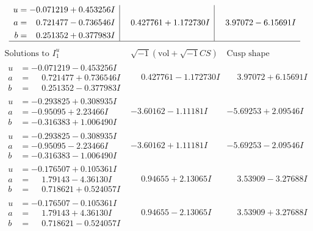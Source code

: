 \documentclass[1p]{elsarticle_modified}
\theoremstyle{definition}
\newcommand{\I}{\sqrt{-1}}
\begin{document}
$$\begin{array}{c|c|c}
\begin{aligned}
u &= -0.071219 + 0.453256 I \\
a &= \phantom{-}0.721477 - 0.736546 I \\
b &= \phantom{-}0.251352 + 0.377983 I\end{aligned}
 & \phantom{-}0.427761 + 1.172730 I & \phantom{-}3.97072 - 6.15691 I\\
 \hline 
 \end{array}$$\newpage$$\begin{array}{c|c|c}  
\text{Solutions to }I^u_{1}& \I (\text{vol} + \sqrt{-1}CS) & \text{Cusp shape}\\
 \hline 
\begin{aligned}
u &= -0.071219 - 0.453256 I \\
a &= \phantom{-}0.721477 + 0.736546 I \\
b &= \phantom{-}0.251352 - 0.377983 I\end{aligned}
 & \phantom{-}0.427761 - 1.172730 I & \phantom{-}3.97072 + 6.15691 I \\ \hline\begin{aligned}
u &= -0.293825 + 0.308935 I \\
a &= -0.95095 + 2.23466 I \\
b &= -0.316383 + 1.006490 I\end{aligned}
 & -3.60162 - 1.11181 I & -5.69253 + 2.09546 I \\ \hline\begin{aligned}
u &= -0.293825 - 0.308935 I \\
a &= -0.95095 - 2.23466 I \\
b &= -0.316383 - 1.006490 I\end{aligned}
 & -3.60162 + 1.11181 I & -5.69253 - 2.09546 I \\ \hline\begin{aligned}
u &= -0.176507 + 0.105361 I \\
a &= \phantom{-}1.79143 - 4.36130 I \\
b &= \phantom{-}0.718621 + 0.524057 I\end{aligned}
 & \phantom{-}0.94655 + 2.13065 I & \phantom{-}3.53909 - 3.27688 I \\ \hline\begin{aligned}
u &= -0.176507 - 0.105361 I \\
a &= \phantom{-}1.79143 + 4.36130 I \\
b &= \phantom{-}0.718621 - 0.524057 I\end{aligned}
 & \phantom{-}0.94655 - 2.13065 I & \phantom{-}3.53909 + 3.27688 I \\ \hline\begin{aligned}

\end{aligned}
\end{array}$$
\end{document}
